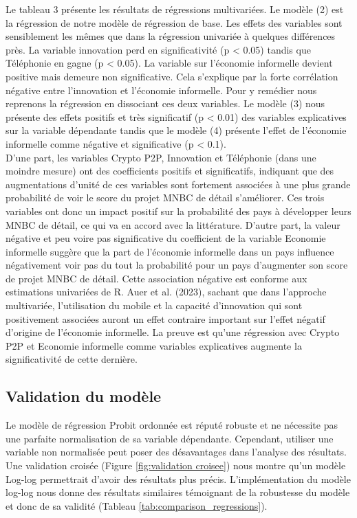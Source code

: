 \documentclass[12pt]{article}
\begin{document}
Le tableau 3 présente les résultats de régressions multivariées. Le modèle (2) est la régression de notre modèle de régression de base. Les effets des variables sont sensiblement les mêmes que dans la régression univariée à quelques différences près. La variable innovation perd en significativité (p < 0.05) tandis que Téléphonie en gagne (p < 0.05). La variable sur l'économie informelle devient positive mais demeure non significative. Cela s'explique par la forte corrélation négative entre l'innovation et l'économie informelle. Pour y remédier nous reprenons la régression en dissociant ces deux variables. Le modèle (3) nous présente des effets positifs et très significatif (p < 0.01) des variables explicatives sur la variable dépendante tandis que le modèle (4) présente l'effet de l'économie informelle comme négative et significative (p < 0.1).\\

D'une part, les variables Crypto P2P, Innovation et Téléphonie (dans une moindre mesure) ont des coefficients positifs et significatifs, indiquant que des augmentations d'unité de ces variables sont fortement associées à une plus grande probabilité de voir le score du projet MNBC de détail s'améliorer. Ces trois variables ont donc un impact positif sur la probabilité des pays à développer leurs MNBC de détail, ce qui va en accord avec la littérature. D'autre part, la valeur négative et peu voire pas significative du coefficient de la variable Economie informelle suggère que la part de l'économie informelle dans un pays influence négativement voir pas du tout la probabilité pour un pays d'augmenter son score de projet MNBC de détail. Cette association négative est conforme aux estimations univariées de R. Auer et al. (2023), sachant que dans l'approche multivariée, l'utilisation du mobile et la capacité d'innovation qui sont positivement associées auront un effet contraire important sur l'effet négatif d'origine de l'économie informelle. La preuve est qu'une régression avec Crypto P2P et Economie informelle comme variables explicatives augmente la significativité de cette dernière.

\subsection{Validation du modèle}

Le modèle de régression Probit ordonnée est réputé robuste et ne nécessite pas une parfaite normalisation de sa variable dépendante. Cependant, utiliser une variable non normalisée peut poser des désavantages dans l'analyse des résultats. Une validation croisée (Figure \ref{fig:validation croisee}) nous montre qu'un modèle Log-log permettrait d'avoir des résultats plus précis. L'implémentation du modèle log-log nous donne des résultats similaires témoignant de la robustesse du modèle et donc de sa validité (Tableau \ref{tab:comparison_regressions}).
 
\end{document}
